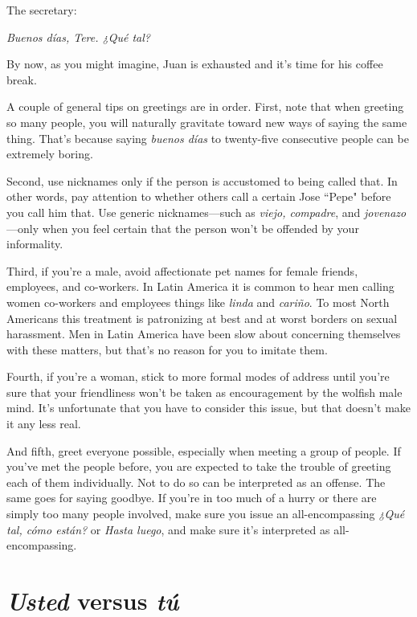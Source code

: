 \inda The secretary:

\indu \emph{Buenos días, Tere. ¿Qué tal?}

\bsk

By now, as you might imagine, Juan is exhausted and it's time for his
coffee break.

A couple of general tips on greetings are in order. First, note
that when greeting so many people, you will naturally gravitate toward
new ways of saying the same thing. That's because saying \emph{buenos días}
to twenty-five consecutive people can be extremely boring.

Second, use nicknames only if the person is accustomed to being called that. In other words, pay attention to whether others call a
certain Jose ``Pepe" before you call him that. Use generic nicknames---such as \emph{viejo, compadre}, and \emph{jovenazo}---only when you feel certain
that the person won't be offended by your informality.

Third, if you're a male, avoid affectionate pet names for female
friends, employees, and co-workers. In Latin America it is common to
hear men calling women co-workers and employees things like \emph{linda}
and \emph{cariño}. To most North Americans this treatment is patronizing at
best and at worst borders on sexual harassment. Men in Latin America
have been slow about concerning themselves with these matters, but
that's no reason for you to imitate them.

Fourth, if you're a woman, stick to more formal modes of address until you're sure that your friendliness won't be taken as encouragement by the wolfish male mind. It's unfortunate that you have to
consider this issue, but that doesn't make it any less real.

And fifth, greet everyone possible, especially when meeting
a group of people. If you've met the people before, you are expected
to take the trouble of greeting each of them individually. Not to do
so can be interpreted as an offense. The same goes for saying goodbye. If you're in too much of a hurry or there are simply too many
people involved, make sure you issue an all-encompassing \emph{¿Qué tal,
	cómo están?} or \emph{Hasta luego}, and make sure it's interpreted as all-encompassing.

\section{\emph{Usted} versus \emph{tú}}

